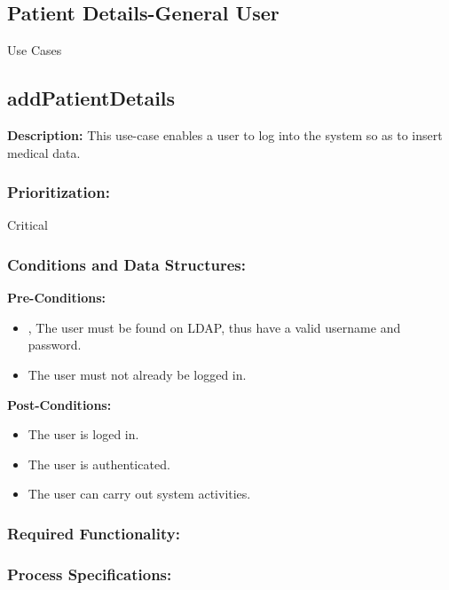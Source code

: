 
\newpage
\setlength{\voffset}{-3cm}

\begin{center}
\section{\textbf{\huge{Patient Details-General User}}}

\Large{Use Cases}
\end{center}


\subsection{addPatientDetails}
\textbf{Description:}
This use-case enables a user to log into the system so as to insert medical data.
\subsubsection{Prioritization:}
Critical
\subsubsection{Conditions and Data Structures:}
\textbf{Pre-Conditions:}
\begin{itemize}
	\item , The user must be found on LDAP, thus have a valid username and password.
	\item The user must not already be logged in.
\end{itemize}

\textbf{Post-Conditions:}	
\begin{itemize}
	\item The user is loged in.
	\item The user is authenticated.
	\item The user can carry out system activities.
\end{itemize}
\subsubsection{Required Functionality:} 
\subsubsection{Process Specifications:} 


